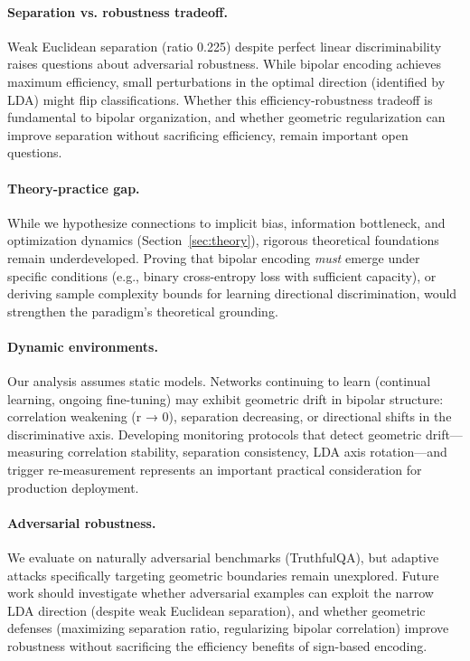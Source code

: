 \documentclass[11pt]{article}
\begin{document}
\paragraph{Separation vs. robustness tradeoff.} Weak Euclidean separation (ratio 0.225) despite perfect linear discriminability raises questions about adversarial robustness. While bipolar encoding achieves maximum efficiency, small perturbations in the optimal direction (identified by LDA) might flip classifications. Whether this efficiency-robustness tradeoff is fundamental to bipolar organization, and whether geometric regularization can improve separation without sacrificing efficiency, remain important open questions.

\paragraph{Theory-practice gap.} While we hypothesize connections to implicit bias, information bottleneck, and optimization dynamics (Section~\ref{sec:theory}), rigorous theoretical foundations remain underdeveloped. Proving that bipolar encoding \textit{must} emerge under specific conditions (e.g., binary cross-entropy loss with sufficient capacity), or deriving sample complexity bounds for learning directional discrimination, would strengthen the paradigm's theoretical grounding.

\paragraph{Dynamic environments.} Our analysis assumes static models. Networks continuing to learn
(continual learning, ongoing fine-tuning) may exhibit geometric drift in bipolar structure: correlation weakening (r → 0), separation decreasing, or directional shifts in the discriminative axis. Developing monitoring protocols that detect geometric drift---measuring correlation stability, separation consistency, LDA axis rotation---and trigger re-measurement represents an important practical consideration for production deployment.

\paragraph{Adversarial robustness.} We evaluate on naturally adversarial benchmarks (TruthfulQA), but
adaptive attacks specifically targeting geometric boundaries remain unexplored. Future work should
investigate whether adversarial examples can exploit the narrow LDA direction (despite weak Euclidean separation), and whether geometric defenses (maximizing separation ratio, regularizing bipolar correlation) improve robustness without sacrificing the efficiency benefits of sign-based encoding.
\end{document}
